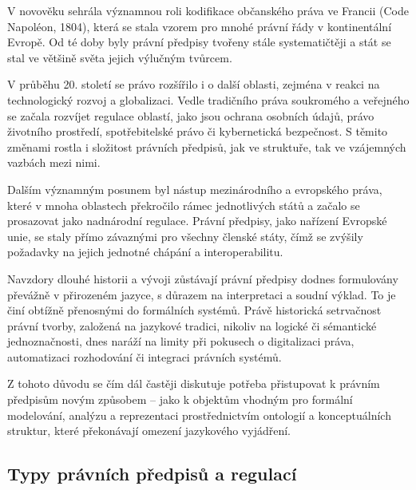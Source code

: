 V novověku sehrála významnou roli kodifikace občanského práva ve Francii (Code Napoléon, 1804), která se stala vzorem pro mnohé právní řády v kontinentální Evropě. Od té doby byly právní předpisy tvořeny stále systematičtěji a stát se stal ve většině světa jejich výlučným tvůrcem. \cite{Napoleon}

V průběhu 20. století se právo rozšířilo i o další oblasti, zejména v reakci na technologický rozvoj a globalizaci. Vedle tradičního práva soukromého a veřejného se začala rozvíjet regulace oblastí, jako jsou ochrana osobních údajů, právo životního prostředí, spotřebitelské právo či kybernetická bezpečnost. S těmito změnami rostla i složitost právních předpisů, jak ve struktuře, tak ve vzájemných vazbách mezi nimi. \cite{Mayo2013,Moran2010}

Dalším významným posunem byl nástup mezinárodního a evropského práva, které v mnoha oblastech překročilo rámec jednotlivých států a začalo se prosazovat jako nadnárodní regulace. Právní předpisy, jako nařízení Evropské unie, se staly přímo závaznými pro všechny členské státy, čímž se zvýšily požadavky na jejich jednotné chápání a interoperabilitu. \cite{Mayo2013}

Navzdory dlouhé historii a vývoji zůstávají právní předpisy dodnes formulovány převážně v přirozeném jazyce, s důrazem na interpretaci a soudní výklad. To je činí obtížně přenosnými do formálních systémů. Právě historická setrvačnost právní tvorby, založená na jazykové tradici, nikoliv na logické či sémantické jednoznačnosti, dnes naráží na limity při pokusech o digitalizaci práva, automatizaci rozhodování či integraci právních systémů. \cite{Vorisek2018,Sarsfield2020}

Z tohoto důvodu se čím dál častěji diskutuje potřeba přistupovat k právním předpisům novým způsobem – jako k objektům vhodným pro formální modelování, analýzu a reprezentaci prostřednictvím ontologií a konceptuálních struktur, které překonávají omezení jazykového vyjádření. \cite{Sarsfield2020}

\subsection{Typy právních předpisů a regulací}
\label{sec:typy-pravnich-predpisu}

